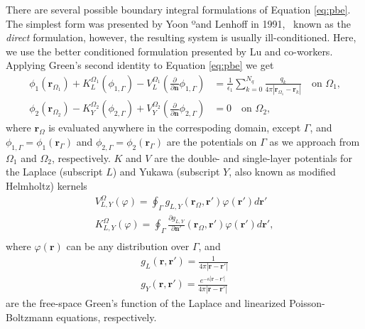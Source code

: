 There are several possible boundary integral formulations of Equation \eqref{eq:pbe}.~\cite{search2022towards} The simplest form was presented by Yoon ºand Lenhoff in 1991,~\cite{YoonLenhoff1990} known as the \emph{direct} formulation, however, the resulting system is usually ill-conditioned. Here, we use the better conditioned formulation presented by Lu and co-workers.~\cite{LuETal2006,LuETal2009,debuhr2016dashmm}
Applying Green's second identity to Equation \eqref{eq:pbe} we get 
%
\begin{align} \label{eq:volume_potential}
\phi_{1}(\mathbf{r}_{\Omega_1})+ K_{L}^{\Omega_1}(\phi_{1,\Gamma}) -  V_{L}^{\Omega_1} \left(\frac{\partial}{\partial \mathbf{n}}  \phi_{1,\Gamma}  \right) & = \frac{1}{\epsilon_1} \sum_{k=0}^{N_q}  \frac{q_k}{4\pi|\mathbf{r}_{\Omega_1} - \mathbf{r}_k|}  \quad \text{on $\Omega_1$,} \nonumber \\
\phi_{2}(\mathbf{r}_{\Omega_2}) - K_{Y}^{\Omega_2}(\phi_{2,\Gamma}) + V_{Y}^{\Omega_2} \left( \frac{\partial}{\partial \mathbf{n}} \phi_{2,\Gamma} \right) & = 0 \quad \text{on $\Omega_2$,}
\end{align}
%
where $\mathbf{r}_\Omega$ is evaluated anywhere in the correspoding domain, except $\Gamma$, and $\phi_{1,\Gamma} = \phi_1(\mathbf{r}_\Gamma)$ and $\phi_{2,\Gamma} = \phi_2(\mathbf{r}_\Gamma)$ are the potentials on $\Gamma$ as we approach from $\Omega_1$ and $\Omega_2$, respectively. $K$ and $V$ are the double- and single-layer potentials for the Laplace (subscript $L$) and Yukawa (subscript $Y$, also known as modified Helmholtz) kernels
%
\begin{align}\label{eq:single_double}
V^\Omega_{L,Y}(\varphi) = \oint_\Gamma g_{L,Y}(\mathbf{r}_\Omega,\mathbf{r}')\varphi(\mathbf{r}')d\mathbf{r}'\nonumber\\
K^\Omega_{L,Y}(\varphi) = \oint_\Gamma \frac{\partial g_{L,Y}}{\partial\mathbf{n}'}(\mathbf{r}_\Omega,\mathbf{r}')\varphi(\mathbf{r}')d\mathbf{r}',\nonumber\\
\end{align}
%
where $\varphi(\mathbf{r})$ can be any distribution over $\Gamma$, and 
%
\begin{align}\label{eq:green_func}
g_L(\mathbf{r},\mathbf{r}')=\frac{1}{4\pi|\mathbf{r}-\mathbf{r}'|} \nonumber \\
g_Y(\mathbf{r},\mathbf{r}')=\frac{e^{-\kappa|\mathbf{r}-\mathbf{r}'|}}{4\pi|\mathbf{r}-\mathbf{r}'|}
\end{align}
%
are the free-space Green's function of the Laplace and linearized Poisson-Boltzmann equations, respectively. 

